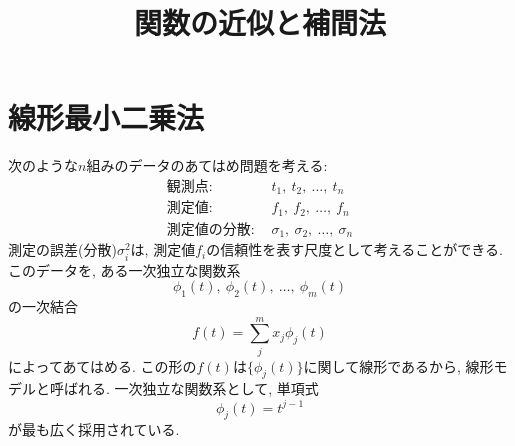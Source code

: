 





\title{関数の近似と補間法}
\maketitle

\section{線形最小二乗法}
次のような$n$組みのデータのあてはめ問題を考える:
\begin{align}
    \mathrm{観測点:}~ & t_{1},~ t_{2},~\ldots,~ t_{n}\\
    \mathrm{測定値:}~ & f_{1},~ f_{2},~\ldots,~ f_{n}\\
    \mathrm{測定値の分散:}~ & \sigma_{1},~ \sigma_{2},~\ldots,~ \sigma_{n}
\end{align}
測定の誤差(分散)$\sigma_{i}^{2}$は, 測定値$f_{i}$の信頼性を表す尺度として考えることができる. 
このデータを, ある一次独立な関数系
\begin{equation}
    \phi_{1}(t),~ \phi_{2}(t),~\ldots,~ \phi_{m}(t)
\end{equation}
の一次結合
\begin{equation}
    f(t) = \sum_{j}^{m} x_{j} \phi_{j}(t)
\end{equation}
によってあてはめる. 
この形の$f(t)$は$\{\phi_{j}(t)\}$に関して線形であるから, 線形モデルと呼ばれる. 
一次独立な関数系として, 単項式
\begin{equation}
    \phi_{j}(t) = t^{j-1}
\end{equation}
が最も広く採用されている. 

